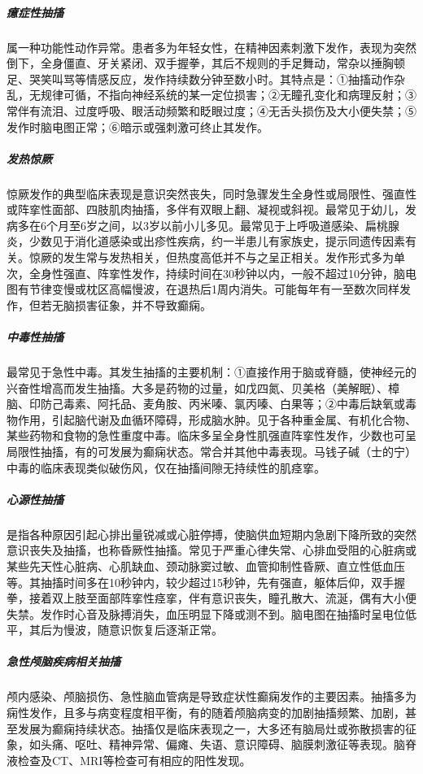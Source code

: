 \subparagraph{癔症性抽搐}

属一种功能性动作异常。患者多为年轻女性，在精神因素刺激下发作，表现为突然倒下，全身僵直、牙关紧闭、双手握拳，其后不规则的手足舞动，常杂以捶胸顿足、哭笑叫骂等情感反应，发作持续数分钟至数小时。其特点是：①抽搐动作杂乱，无规律可循，不指向神经系统的某一定位损害；②无瞳孔变化和病理反射；③常伴有流泪、过度呼吸、眼活动频繁和眨眼过度；④无舌头损伤及大小便失禁；⑤发作时脑电图正常；⑥暗示或强刺激可终止其发作。

\subparagraph{发热惊厥}

惊厥发作的典型临床表现是意识突然丧失，同时急骤发生全身性或局限性、强直性或阵挛性面部、四肢肌肉抽搐，多伴有双眼上翻、凝视或斜视。最常见于幼儿，发病多在6个月至6岁之间，以3岁以前小儿多见。最常见于上呼吸道感染、扁桃腺炎，少数见于消化道感染或出疹性疾病，约一半患儿有家族史，提示同遗传因素有关。惊厥的发生常与发热相关，但热度高低并不与之呈正相关。发作形式多为单次，全身性强直、阵挛性发作，持续时间在30秒钟以内，一般不超过10分钟，脑电图有节律变慢或枕区高幅慢波，在退热后1周内消失。可能每年有一至数次同样发作，但若无脑损害征象，并不导致癫痫。

\subparagraph{中毒性抽搐}

最常见于急性中毒。其发生抽搐的主要机制：①直接作用于脑或脊髓，使神经元的兴奋性增高而发生抽搐。大多是药物的过量，如戊四氮、贝美格（美解眠）、樟脑、印防己毒素、阿托品、麦角胺、丙米嗪、氯丙嗪、白果等；②中毒后缺氧或毒物作用，引起脑代谢及血循环障碍，形成脑水肿。见于各种重金属、有机化合物、某些药物和食物的急性重度中毒。临床多呈全身性肌强直阵挛性发作，少数也可呈局限性抽搐，有的可发展为癫痫状态。常合并其他中毒表现。马钱子碱（士的宁）中毒的临床表现类似破伤风，仅在抽搐间隙无持续性的肌痉挛。

\subparagraph{心源性抽搐}

是指各种原因引起心排出量锐减或心脏停搏，使脑供血短期内急剧下降所致的突然意识丧失及抽搐，也称昏厥性抽搐。常见于严重心律失常、心排血受阻的心脏病或某些先天性心脏病、心肌缺血、颈动脉窦过敏、血管抑制性昏厥、直立性低血压等。其抽搐时间多在10秒钟内，较少超过15秒钟，先有强直，躯体后仰，双手握拳，接着双上肢至面部阵挛性痉挛，伴有意识丧失，瞳孔散大、流涎，偶有大小便失禁。发作时心音及脉搏消失，血压明显下降或测不到。脑电图在抽搐时呈电位低平，其后为慢波，随意识恢复后逐渐正常。

\subparagraph{急性颅脑疾病相关抽搐}

颅内感染、颅脑损伤、急性脑血管病是导致症状性癫痫发作的主要因素。抽搐多为痫性发作，且多与病变程度相平衡，有的随着颅脑病变的加剧抽搐频繁、加剧，甚至发展为癫痫持续状态。抽搐仅是临床表现之一，大多还有脑局灶或弥散损害的征象，如头痛、呕吐、精神异常、偏瘫、失语、意识障碍、脑膜刺激征等表现。脑脊液检查及CT、MRI等检查可有相应的阳性发现。

